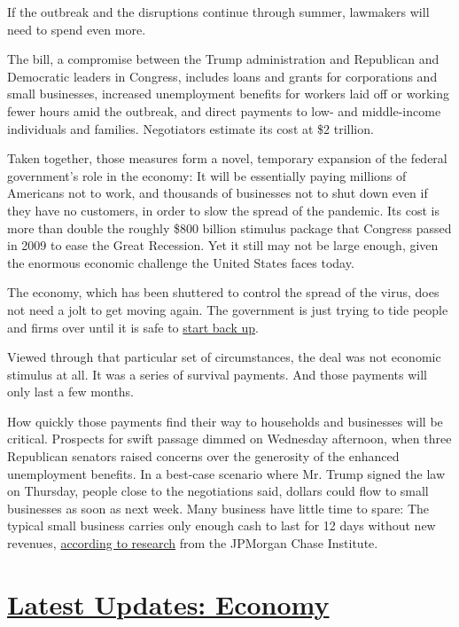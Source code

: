 If the outbreak and the disruptions continue through summer, lawmakers
will need to spend even more.

The bill, a compromise between the Trump administration and Republican
and Democratic leaders in Congress, includes loans and grants for
corporations and small businesses, increased unemployment benefits for
workers laid off or working fewer hours amid the outbreak, and direct
payments to low- and middle-income individuals and families. Negotiators
estimate its cost at \$2 trillion.

Taken together, those measures form a novel, temporary expansion of the
federal government's role in the economy: It will be essentially paying
millions of Americans not to work, and thousands of businesses not to
shut down even if they have no customers, in order to slow the spread of
the pandemic. Its cost is more than double the roughly \$800 billion
stimulus package that Congress passed in 2009 to ease the Great
Recession. Yet it still may not be large enough, given the enormous
economic challenge the United States faces today.

The economy, which has been shuttered to control the spread of the
virus, does not need a jolt to get moving again. The government is just
trying to tide people and firms over until it is safe to
\href{https://www.nytimes.com/2020/03/24/business/economy/coronavirus-economy.html}{start
back up}.

Viewed through that particular set of circumstances, the deal was not
economic stimulus at all. It was a series of survival payments. And
those payments will only last a few months.

How quickly those payments find their way to households and businesses
will be critical. Prospects for swift passage dimmed on Wednesday
afternoon, when three Republican senators raised concerns over the
generosity of the enhanced unemployment benefits. In a best-case
scenario where Mr. Trump signed the law on Thursday, people close to the
negotiations said, dollars could flow to small businesses as soon as
next week. Many business have little time to spare: The typical small
business carries only enough cash to last for 12 days without new
revenues,
\href{https://institute.jpmorganchase.com/content/dam/jpmc/jpmorgan-chase-and-co/institute/pdf/institute-growth-vitality-cash-flows.pdf}{according
to research} from the JPMorgan Chase Institute.

\hypertarget{latest-updates-economy}{%
\section{\texorpdfstring{\href{https://www.nytimes.com/live/2020/07/31/business/stock-market-today-coronavirus?action=click\&pgtype=Article\&state=default\&region=MAIN_CONTENT_1\&context=storylines_live_updates}{Latest
Updates:
Economy}}{Latest Updates: Economy}}\label{latest-updates-economy}}

